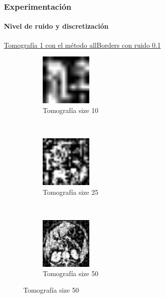 \documentclass{beamer}
\begin{document}
\begin{frame}
  \frametitle{Experimentación}
  \framesubtitle{Nivel de ruido y discretización}
  \underline{Tomografía 1 con el método allBorders con ruido 0.1}
  \begin{figure}[H]
    \centering
      \begin{subfigure}[t]{0.3\textwidth}
          \centering
          \includegraphics[height=1.0in]{imagenes/noise/4.png}
          \caption{Tomografía size 10}
      \end{subfigure}
      ~ 
      \begin{subfigure}[t]{0.3\textwidth}
          \centering
          \includegraphics[height=1.0in]{imagenes/noise/5.png}
          \caption{Tomografía size 25}
      \end{subfigure}
      ~ 
      \begin{subfigure}[t]{0.3\textwidth}
          \centering
          \includegraphics[height=1.0in]{imagenes/noise/6.png}
          \caption{Tomografía size 50}
      \end{subfigure}
  \end{figure}
\end{frame}

\end{document}

